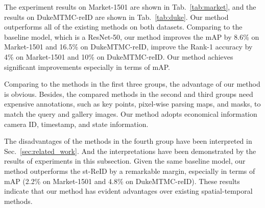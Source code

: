 \documentclass[10pt,twocolumn,letterpaper]{article}
\begin{document}
The experiment results on Market-1501 are shown in Tab.~\ref{tab:market}, and the results on DukeMTMC-reID are shown in Tab.~\ref{tab:duke}.
Our method outperforms all of the existing methods on both datasets. Comparing to the baseline model, which is a ResNet-50, our method improves the mAP by 8.6\% on Market-1501 and 16.5\% on DukeMTMC-reID, improve the Rank-1 accuracy by 4\% on Market-1501 and 10\% on DukeMTMC-reID. Our method achieves significant improvements especially in terms of mAP.

Comparing to the methods in the first three groups, the advantage of our method is obvious. Besides,  the compared methods in the second and third groups need expensive annotations, such as key points, pixel-wise parsing maps, and masks, to match the query and gallery images. Our method adopts economical information \ie camera ID, timestamp, and state information.

The disadvantages of the methods in the fourth group have been interpreted in Sec.~\ref{sec:related_work}. And the interpretations have been demonstrated by the results of experiments in this subsection.
Given the same baseline model, our method outperforms the st-ReID by a remarkable margin, especially in terms of mAP (2.2\% on Market-1501 and 4.8\% on DukeMTMC-reID). These results indicate that our method has evident advantages over existing spatial-temporal methods.
\end{document}
